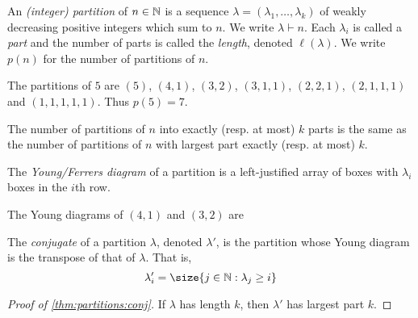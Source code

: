\begin{definition}[Partitions] \label{def:partitions}
    An \emph{(integer) partition} of $n \in \mathbb{N}$ is a sequence
    $\lambda = (\lambda_1, \dots, \lambda_k)$ of weakly decreasing positive
    integers which sum to $n$.
    We write $\lambda \vdash n$.
    Each $\lambda_i$ is called a \emph{part} and the number of parts is
    called the \emph{length}, denoted $\ell(\lambda)$.
    We write $p(n)$ for the number of partitions of $n$.
\end{definition}
\begin{example}
    The partitions of $5$ are $(5)$, $(4, 1)$, $(3, 2)$, $(3, 1, 1)$,
    $(2, 2, 1)$, $(2, 1, 1, 1)$ and $(1, 1, 1, 1, 1)$.
    Thus $p(5) = 7$.
\end{example}

\begin{proposition} \label{thm:partitions:conj}
    The number of partitions of $n$ into exactly (resp. at most) $k$ parts
    is the same as the number of partitions of $n$ with largest part exactly
    (resp. at most) $k$.
\end{proposition}

\begin{definition} \label{def:young}
    The \emph{Young/Ferrers diagram} of a partition is a left-justified
    array of boxes with $\lambda_i$ boxes in the $i$th row.
\end{definition}
\begin{example}
    The Young diagrams of $(4, 1)$ and $(3, 2)$ are
    \begin{center}
        \qquad
    \end{center}
\end{example}

\begin{definition}[Conjugate] \label{def:partition:conjugate}
    The \emph{conjugate} of a partition $\lambda$, denoted $\lambda'$, is
    the partition whose Young diagram is the transpose of that of $\lambda$.
    That is, \[
        \lambda'_i = \size \set{j \in \N : \lambda_j \ge i}
    \]
\end{definition}

\begin{proof}[Proof of \cref{thm:partitions:conj}]
    If $\lambda$ has length $k$, then $\lambda'$ has largest part $k$.
\end{proof}

